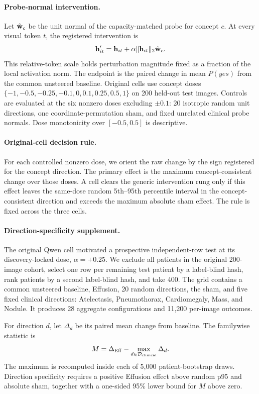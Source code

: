 \paragraph{Probe-normal intervention.}
Let $\hat{\mathbf{w}}_c$ be the unit normal of the capacity-matched probe for concept $c$. At every visual token $t$, the registered intervention is
\begin{equation}
\mathbf{h}'_{it}=\mathbf{h}_{it}+\alpha\lVert\mathbf{h}_{it}\rVert_2\hat{\mathbf{w}}_c.
\label{eq:intervention}
\end{equation}
This relative-token scale holds perturbation magnitude fixed as a fraction of the local activation norm. The endpoint is the paired change in mean $P(yes)$ from the common unsteered baseline. Original cells use concept doses $\{-1,-0.5,-0.25,-0.1,0,0.1,0.25,0.5,1\}$ on 200 held-out test images. Controls are evaluated at the six nonzero doses excluding $\pm0.1$: 20 isotropic random unit directions, one coordinate-permutation sham, and fixed unrelated clinical probe normals. Dose monotonicity over $[-0.5,0.5]$ is descriptive.

\paragraph{Original-cell decision rule.}
For each controlled nonzero dose, we orient the raw change by the sign registered for the concept direction. The primary effect is the maximum concept-consistent change over those doses. A cell clears the generic intervention rung only if this effect leaves the same-dose random 5th--95th percentile interval in the concept-consistent direction and exceeds the maximum absolute sham effect. The rule is fixed across the three cells.

\paragraph{Direction-specificity supplement.}
The original Qwen cell motivated a prospective independent-row test at its discovery-locked dose, $\alpha=+0.25$. We exclude all patients in the original 200-image cohort, select one row per remaining test patient by a label-blind hash, rank patients by a second label-blind hash, and take 400. The grid contains a common unsteered baseline, Effusion, 20 random directions, the sham, and five fixed clinical directions: Atelectasis, Pneumothorax, Cardiomegaly, Mass, and Nodule. It produces 28 aggregate configurations and 11,200 per-image outcomes.

For direction $d$, let $\Delta_d$ be its paired mean change from baseline. The familywise statistic is
\begin{equation}
M=\Delta_{\mathrm{Eff}}-\max_{d\in\mathcal D_{\mathrm{clinical}}}\Delta_d.
\label{eq:margin}
\end{equation}
The maximum is recomputed inside each of 5,000 patient-bootstrap draws. Direction specificity requires a positive Effusion effect above random p95 and absolute sham, together with a one-sided 95\% lower bound for $M$ above zero.

